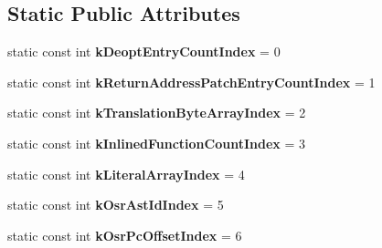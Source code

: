 \subsection*{Static Public Attributes}
\begin{DoxyCompactItemize}
\item 
\hypertarget{classv8_1_1internal_1_1_deoptimization_input_data_aa65d3e99e36c5d7eaac73bc4df5df4b0}{}static const int {\bfseries k\+Deopt\+Entry\+Count\+Index} = 0\label{classv8_1_1internal_1_1_deoptimization_input_data_aa65d3e99e36c5d7eaac73bc4df5df4b0}

\item 
\hypertarget{classv8_1_1internal_1_1_deoptimization_input_data_a23037e946bdf1d4087d946268f0d6ddc}{}static const int {\bfseries k\+Return\+Address\+Patch\+Entry\+Count\+Index} = 1\label{classv8_1_1internal_1_1_deoptimization_input_data_a23037e946bdf1d4087d946268f0d6ddc}

\item 
\hypertarget{classv8_1_1internal_1_1_deoptimization_input_data_a9414a7454edca2152a1558c5e0b1206d}{}static const int {\bfseries k\+Translation\+Byte\+Array\+Index} = 2\label{classv8_1_1internal_1_1_deoptimization_input_data_a9414a7454edca2152a1558c5e0b1206d}

\item 
\hypertarget{classv8_1_1internal_1_1_deoptimization_input_data_a0907e7b8c2dc48bfa5ea7f118a9a7e42}{}static const int {\bfseries k\+Inlined\+Function\+Count\+Index} = 3\label{classv8_1_1internal_1_1_deoptimization_input_data_a0907e7b8c2dc48bfa5ea7f118a9a7e42}

\item 
\hypertarget{classv8_1_1internal_1_1_deoptimization_input_data_ac0fd200633e64854fcdb28c648f468c5}{}static const int {\bfseries k\+Literal\+Array\+Index} = 4\label{classv8_1_1internal_1_1_deoptimization_input_data_ac0fd200633e64854fcdb28c648f468c5}

\item 
\hypertarget{classv8_1_1internal_1_1_deoptimization_input_data_abe96762c20c854160796daedb0abb89e}{}static const int {\bfseries k\+Osr\+Ast\+Id\+Index} = 5\label{classv8_1_1internal_1_1_deoptimization_input_data_abe96762c20c854160796daedb0abb89e}

\item 
\hypertarget{classv8_1_1internal_1_1_deoptimization_input_data_ae1ebe178aed6e2ab48964da6bd5baad4}{}static const int {\bfseries k\+Osr\+Pc\+Offset\+Index} = 6\label{classv8_1_1internal_1_1_deoptimization_input_data_ae1ebe178aed6e2ab48964da6bd5baad4}


\end{DoxyCompactItemize}
